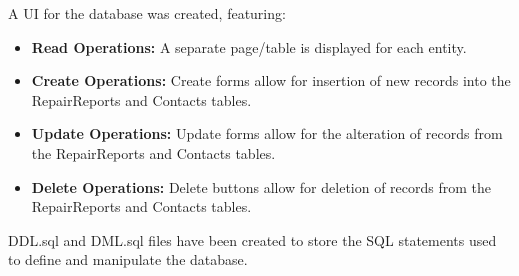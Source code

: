 \documentclass{article}
\begin{document}
\vspace{1cm}

\begin{tcolorbox}[colback=secondarycolor, colframe=primarycolor, arc=5mm, title=\textbf{Step 2 --> Step 3}]
A UI for the database was created, featuring:
\vspace{0.2cm}
\begin{itemize}
  \item \textbf{Read Operations:} A separate page/table is displayed for each entity.
  \vspace{0.1cm}
  \item \textbf{Create Operations:} Create forms allow for insertion of new records into the RepairReports and Contacts tables.
  \vspace{0.1cm}
  \item \textbf{Update Operations:} Update forms allow for the alteration of records from the RepairReports and Contacts tables.
  \vspace{0.1cm}
  \item \textbf{Delete Operations:} Delete buttons allow for deletion of records from the RepairReports and Contacts tables.
  \end{itemize}
\vspace{0.2cm}
DDL.sql and DML.sql files have been created to store the SQL statements used to define and manipulate the database.
\end{tcolorbox}
\end{document}

